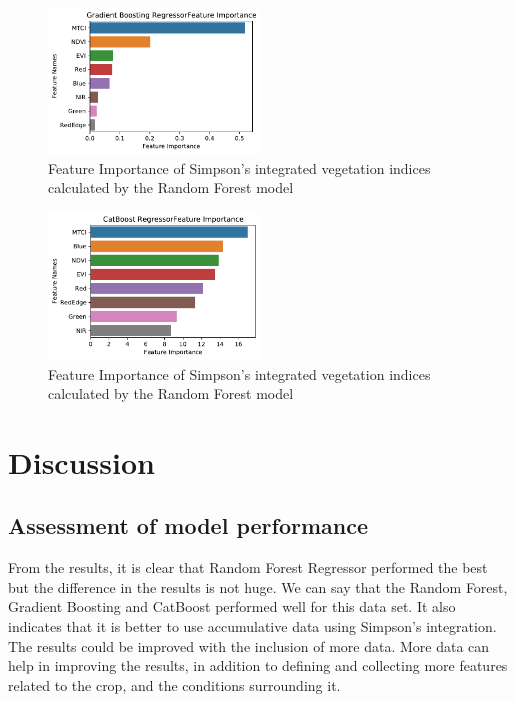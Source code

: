 \documentclass[sigconf, nonacm, natbib, screen, balance=False]{acmart}
\begin{document}
\begin{figure}[!h]
   \hspace*{-0.25in}
   \includegraphics[width=0.5\textwidth, angle=0,]{feature_importance_GB.pdf}
  \caption{Feature Importance of Simpson's integrated vegetation indices calculated by the Random Forest model}
  \label{fig:festure_gb}
\end{figure}

\begin{figure}[!h]
   \hspace*{-0.25in}
   \includegraphics[width=0.5\textwidth, angle=0,]{feature_importance_CB.pdf}
  \caption{Feature Importance of Simpson's integrated vegetation indices calculated by the Random Forest model}
  \label{fig:festure_cb}
\end{figure}
 

\section{Discussion}\label{sec:discussion}

\subsection{Assessment of model performance}\label{sec:assessment}

From the results, it is clear that Random Forest Regressor performed the best but the difference in the results is not huge. We can say that the Random Forest, Gradient Boosting and CatBoost performed well for this data set. It also indicates that it is better to use accumulative data using Simpson's integration. The results could be improved with the inclusion of more data. More data can help in improving the results, in addition to defining and collecting more features related to the crop, and the conditions surrounding it. 
\end{document}
